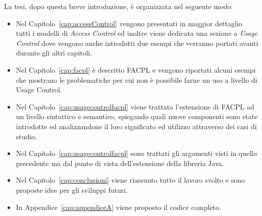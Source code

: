 La tesi, dopo questa breve introduzione, è organizzata nel seguente modo: 
\begin{itemize}
\item Nel Capitolo~\ref{cap:accessControl} vengono
presentati in maggior dettaglio tutti i modelli di \textit{Access Control} ed inoltre viene dedicata una sezione a \textit{Usage Control}
dove vengono anche introdotti due esempi che verranno portati avanti
durante gli altri capitoli.
\item Nel Capitolo~\ref{cap:facpl} è descritto \ac{FACPL} e vengono riportati alcuni esempi che mostrano le problematiche per cui non è possibile farne un uso a livello di Usage Control.
\item Nel Capitolo~\ref{cap:usagecontrolfacpl} viene trattata l’estensione di \ac{FACPL} ad un livello sintattico
e semantico, spiegando quali nuove componenti sono state introdotte ed
analizzandone il loro significato ed utilizzo attraverso dei casi di studio.
\item Nel Capitolo~\ref{cap:usagecontrolfacpl} sono trattati gli argomenti
visti in quello precedente ma dal punto di vista dell’estensione della
libreria Java.
\item Nel Capitolo~\ref{cap:conclusioni} viene riassunto tutto il lavoro svolto e sono proposte idee per gli sviluppi futuri.

\item In Appendice~\ref{cap:appendiceA} viene proposto il codice completo.
\end{itemize}
